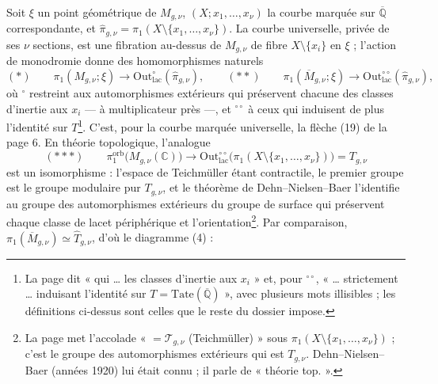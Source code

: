 \documentclass[11pt,a4paper]{article}
\begin{document}
Soit $\xi$ un point géométrique de $M_{g,\nu}$, $(X; x_1, \ldots, x_\nu)$ la
courbe marquée sur $\overline{\mathbb{Q}}$ correspondante, et
$\widehat\pi_{g,\nu} = \pi_1(X \setminus \{x_1, \ldots, x_\nu\})$. La
courbe universelle, privée de ses $\nu$ sections, est une fibration au-dessus
de $M_{g,\nu}$ de fibre $X \setminus \{x_i\}$ en $\xi$ ; l'action de monodromie
donne des homomorphismes naturels
\[
(*)\qquad \pi_1(M_{g,\nu}; \xi) \longrightarrow
\mathrm{Out}^{\circ}_{\mathrm{lac}}(\widehat\pi_{g,\nu}),
\qquad
(**)\qquad \pi_1(\overline{M}_{g,\nu}; \xi) \longrightarrow
\mathrm{Out}^{\circ\circ}_{\mathrm{lac}}(\widehat\pi_{g,\nu}),
\]
où ${}^{\circ}$ restreint aux automorphismes extérieurs qui préservent chacune
des classes d'inertie aux $x_i$ — à multiplicateur près —, et ${}^{\circ\circ}$
à ceux qui induisent de plus l'identité sur $T$\footnote{La page dit « qui …
les classes d'inertie aux $x_i$ » et, pour ${}^{\circ\circ}$, « … strictement
… induisant l'identité sur $T = \mathrm{Tate}(\overline{\mathbb{Q}})$ », avec
plusieurs mots illisibles ; les définitions ci-dessus sont celles que le reste
du dossier impose.}. C'est, pour la courbe marquée universelle, la flèche (19)
de la page 6. En théorie topologique, l'analogue
\[
(***)\qquad \pi_1^{\mathrm{orb}}\bigl(M_{g,\nu}(\mathbb{C})\bigr)
\longrightarrow \mathrm{Out}^{\circ\circ}_{\mathrm{lac}}\bigl(\pi_1(X \setminus
\{x_1, \ldots, x_\nu\})\bigr) = T_{g,\nu}
\]
est un isomorphisme : l'espace de Teichmüller étant contractile, le premier
groupe est le groupe modulaire pur $T_{g,\nu}$, et le théorème de
Dehn--Nielsen--Baer l'identifie au groupe des automorphismes extérieurs du
groupe de surface qui préservent chaque classe de lacet périphérique et
l'orientation\footnote{La page met l'accolade « $= \mathcal{T}_{g,\nu}$
(Teichmüller) » sous $\pi_1(X \setminus \{x_1, \ldots, x_\nu\})$ ; c'est le
groupe des automorphismes extérieurs qui est $T_{g,\nu}$. Dehn--Nielsen--Baer
(années 1920) lui était connu ; il parle de « théorie top. ».}. Par
comparaison, $\pi_1(\overline{M}_{g,\nu}) \simeq \widehat T_{g,\nu}$, d'où le
diagramme (4) :

\end{document}
